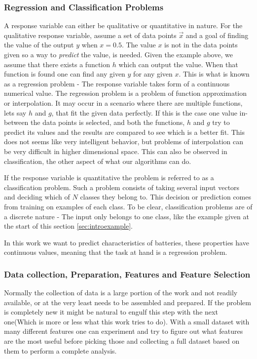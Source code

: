 	\subsubsection{Regression and Classification Problems}
        A response variable can either be qualitative or quantitative in nature. For the qualitative response variable, assume a set of data points $\vec{x}$ and a goal of finding the value of the output $y$ when $x = 0.5$. The value $x$ is not in the data points given so a way to \textit{predict} the value, is needed. Given the example above, we assume that there exists a function $h$ which can output the value. When that function is found one can find any given $y$ for any given $x$. This is what is known as a regression problem - The response variable takes form of a continuous numerical value. The regression problem is a problem of function approximation or interpolation. It may occur in a scenario where there are multiple functions, lets say $h$ and $g$, that fit the given data perfectly. If this is the case one value in-between the data points is selected, and both the functions, $h$ and $g$ try to predict its values and the results are compared to see which is a better fit.
	This does not seems like very intelligent behavior, but problems of interpolation can be very difficult in higher dimensional space. This can also be observed in classification, the other aspect of what our algorithms can do.
	
	If the response variable is quantitative the problem is referred to as a classification problem. Such a problem consists of taking several input vectors and deciding which of $N$ classes they belong to. This decision or prediction comes from training on examples of each class. To be clear, classification problems are of a discrete nature - The input only belongs to one class, like the example given at the start of this section \ref{sec:introexample}.
	
	In this work we want to predict characteristics of batteries, these properties have continuous values, meaning that the task at hand is a regression problem.
	
	\subsubsection{Data collection, Preparation, Features and Feature Selection}
	Normally the collection of data is a large portion of the work and not readily available, or at the very least needs to be assembled and prepared. If the problem is completely new it might be natural to engulf this step with the next one(Which is more or less what this work tries to do). With a small dataset with many different features one can experiment and try to figure out what features are the most useful before picking those and collecting a full dataset based on them to perform a complete analysis.
	
